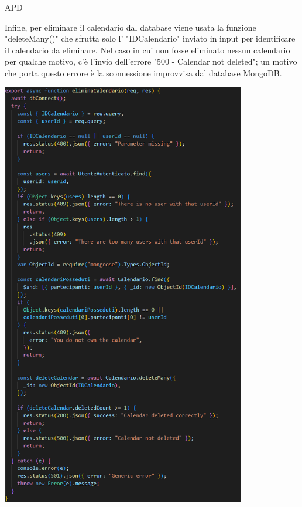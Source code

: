 \begin{listaPersonale} {APD}
\begin{listaPersonale2}[APD]{}
                Infine, per eliminare il calendario dal database viene usata la funzione "deleteMany()" che sfrutta solo l' "IDCalendario" inviato in input per identificare il calendario da eliminare. Nel caso in cui non fosse eliminato nessun calendario per qualche motivo, c'è l'invio dell'errore "500 - Calendar not deleted"; un motivo che porta questo errore è la sconnessione improvvisa dal database MongoDB.
                \begin{center}
                    \includegraphics[width=0.8\textwidth, height=0.9\textheight]{img/png/APIs/eliminaCalendario.png}
                \end{center}

\end{listaPersonale2}
\end{listaPersonale}
